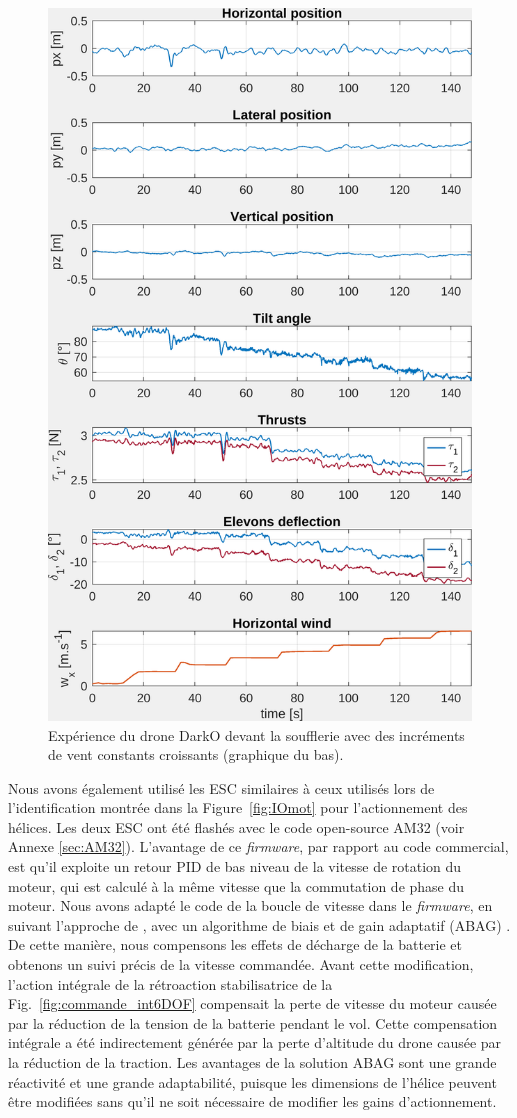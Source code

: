 \begin{figure}[ht!]
    \centering
    \includegraphics[trim=0cm 0cm 0cm 0cm,clip,width=0.6\columnwidth]{figures/exp_systune_struct.png}
    \caption{Expérience du drone DarkO devant la soufflerie avec des incréments de vent constants croissants (graphique du bas).}
    \label{fig:ExpSytuneStruct}
\end{figure}

Nous avons également utilisé les ESC similaires à ceux utilisés lors de l'identification montrée dans la Figure~\ref{fig:IOmot} pour l'actionnement des hélices. Les deux ESC ont été flashés avec le code open-source AM32 (voir Annexe \ref{sec:AM32}). L'avantage de ce \textit{firmware}, par rapport au code commercial, est qu'il exploite un retour PID  de bas niveau de la vitesse de rotation du moteur, qui est calculé à la même vitesse que la commutation de phase du moteur. Nous avons adapté le code de la boucle de vitesse dans le \textit{firmware}, en suivant l'approche de \cite{franchi2017}, avec un algorithme de biais et de gain adaptatif (ABAG) . De cette manière, nous compensons les effets de décharge de la batterie et obtenons un suivi précis de la vitesse commandée. Avant cette modification, l'action intégrale de la rétroaction stabilisatrice de la Fig.~\ref{fig:commande_int6DOF} compensait la perte de vitesse du moteur causée par la réduction de la tension de la batterie pendant le vol. Cette compensation intégrale a été indirectement générée par la perte d'altitude du drone causée par la réduction de la traction. Les avantages de la solution ABAG sont une grande réactivité et une grande adaptabilité, puisque les dimensions de l'hélice peuvent être modifiées sans qu'il ne soit nécessaire de modifier les gains d'actionnement.

